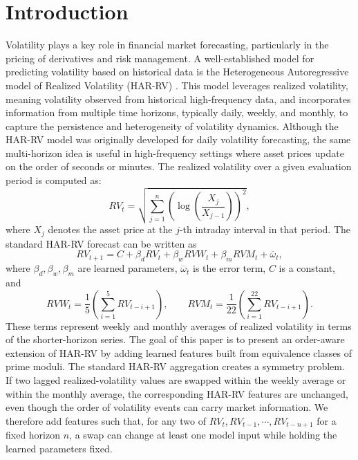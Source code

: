 \documentclass[11pt,a4paper]{article}
\begin{document}
\section{Introduction}
\vspace{0.3cm}
\noindent
Volatility plays a key role in financial market forecasting, particularly in the pricing of derivatives and risk management. A well-established model for predicting volatility based on historical data is the Heterogeneous Autoregressive model of Realized Volatility (HAR-RV) \cite{corsi2009}. This model leverages realized volatility, meaning volatility observed from historical high-frequency data, and incorporates information from multiple time horizons, typically daily, weekly, and monthly, to capture the persistence and heterogeneity of volatility dynamics. Although the HAR-RV model was originally developed for daily volatility forecasting, the same multi-horizon idea is useful in high-frequency settings where asset prices update on the order of seconds or minutes. The realized volatility over a given evaluation period is computed as:
\[
RV_t = \sqrt{\sum_{j=1}^n \left(\log\left(\frac{X_j}{X_{j-1}}\right)\right)^2},
\]
where $X_j$ denotes the asset price at the $j$-th intraday interval in that period.
\vspace{0.3cm}
\noindent The standard HAR-RV forecast can be written as
\[
RV_{t+1} = C + \beta_d RV_t + \beta_wRVW_t + \beta_m RVM_t + \overline{\omega}_t,
\]
where $\beta_d, \beta_w, \beta_m$ are learned parameters, $\overline{\omega}_t$ is the error term, $C$ is a constant, and
\[
RVW_t = \frac15\left(\sum_{i=1}^5 RV_{t-i+1}\right),
\qquad
RVM_t = \frac1{22}\left(\sum_{i=1}^{22} RV_{t-i+1}\right).
\]
These terms represent weekly and monthly averages of realized volatility in terms of the shorter-horizon series. The goal of this paper is to present an order-aware extension of HAR-RV by adding learned features built from equivalence classes of prime moduli.
\vspace{0.3cm}
\noindent The standard HAR-RV aggregation creates a symmetry problem. If two lagged realized-volatility values are swapped within the weekly average or within the monthly average, the corresponding HAR-RV features are unchanged, even though the order of volatility events can carry market information. We therefore add features such that, for any two of $RV_t, RV_{t-1}, \cdots, RV_{t-n+1}$ for a fixed horizon $n$, a swap can change at least one model input while holding the learned parameters fixed.
\end{document}
